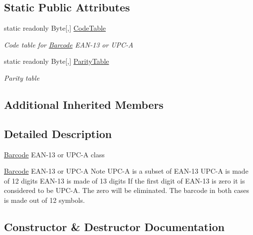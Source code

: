 \subsection*{Static Public Attributes}
\begin{DoxyCompactItemize}
\item 
static readonly Byte\mbox{[},\mbox{]} \hyperlink{class_pdf_file_writer_1_1_barcode_e_a_n13_a83712fff996406d424848ca5a59e7507}{Code\+Table}
\begin{DoxyCompactList}\small\item\em Code table for \hyperlink{class_pdf_file_writer_1_1_barcode}{Barcode} E\+A\+N-\/13 or U\+P\+C-\/A \end{DoxyCompactList}\item 
static readonly Byte\mbox{[},\mbox{]} \hyperlink{class_pdf_file_writer_1_1_barcode_e_a_n13_ad88f52a0be979f25071f4ffa0165142e}{Parity\+Table}
\begin{DoxyCompactList}\small\item\em Parity table \end{DoxyCompactList}\end{DoxyCompactItemize}
\subsection*{Additional Inherited Members}


\subsection{Detailed Description}
\hyperlink{class_pdf_file_writer_1_1_barcode}{Barcode} E\+A\+N-\/13 or U\+P\+C-\/A class 

\hyperlink{class_pdf_file_writer_1_1_barcode}{Barcode} E\+A\+N-\/13 or U\+P\+C-\/A Note U\+P\+C-\/A is a subset of E\+A\+N-\/13 U\+P\+C-\/A is made of 12 digits E\+A\+N-\/13 is made of 13 digits If the first digit of E\+A\+N-\/13 is zero it is considered to be U\+P\+C-\/A. The zero will be eliminated. The barcode in both cases is made out of 12 symbols. 

\subsection{Constructor \& Destructor Documentation}
